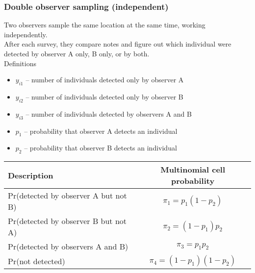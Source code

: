 \documentclass[color=usenames,dvipsnames]{beamer}\usepackage[]{graphicx}\usepackage[]{xcolor}
\begin{document}
\begin{frame}
  \frametitle{Double observer sampling (independent)}
  \small
  Two observers sample the same location at the same time, working independently. \\
  \pause
  \vfill
  After each survey, they compare notes and figure out which
  individual were detected by observer A only, B only, or by both. \\
  \pause
  \vfill
  Definitions
  \begin{itemize}
    \setlength\itemsep{0.5pt}
    \item $y_{i1}$ -- number of individuals detected only by observer A
    \item $y_{i2}$ -- number of individuals detected only by observer B
    \item $y_{i3}$ -- number of individuals detected by observers A and B
    \item $p_1$ -- probability that observer A detects an individual 
    \item $p_2$ -- probability that observer B detects an individual 
  \end{itemize}
  \pause \vfill
  \footnotesize
  \begin{tabular}{lc}
    \hline
    \centering
    Description & Multinomial cell probability \\
    \hline
    Pr(detected by observer A but not B) & $\pi_1 = p_1(1-p_2)$ \\
    Pr(detected by observer B but not A) & $\pi_2 = (1-p_1)p_2$ \\
    Pr(detected by observers A and B) & $\pi_3 = p_1p_2$ \\
    Pr(not detected) & $\pi_4 = (1-p_1)(1-p_2)$ \\
    \hline
  \end{tabular}
\end{frame}
\end{document}
